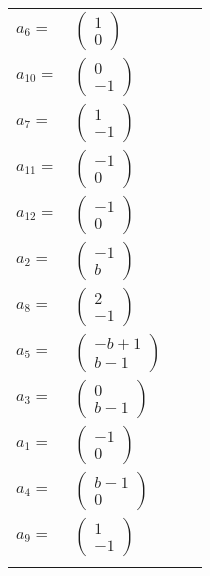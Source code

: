 \documentclass[1p]{elsarticle_modified}
\theoremstyle{definition}
\begin{document}
\begin{tabular}{m{7pt} m{180pt} m{7pt} m{180pt} }
\flushright $a_{6}=$&$\begin{pmatrix}1\\0\end{pmatrix}$ \\
\flushright $a_{10}=$&$\begin{pmatrix}0\\-1\end{pmatrix}$ \\
\flushright $a_{7}=$&$\begin{pmatrix}1\\-1\end{pmatrix}$ \\
\flushright $a_{11}=$&$\begin{pmatrix}-1\\0\end{pmatrix}$ \\
\flushright $a_{12}=$&$\begin{pmatrix}-1\\0\end{pmatrix}$ \\
\flushright $a_{2}=$&$\begin{pmatrix}-1\\b\end{pmatrix}$ \\
\flushright $a_{8}=$&$\begin{pmatrix}2\\-1\end{pmatrix}$ \\
\flushright $a_{5}=$&$\begin{pmatrix}- b+1\\b-1\end{pmatrix}$ \\
\flushright $a_{3}=$&$\begin{pmatrix}0\\b-1\end{pmatrix}$ \\
\flushright $a_{1}=$&$\begin{pmatrix}-1\\0\end{pmatrix}$ \\
\flushright $a_{4}=$&$\begin{pmatrix}b-1\\0\end{pmatrix}$ \\
\flushright $a_{9}=$&$\begin{pmatrix}1\\-1\end{pmatrix}$\\&\end{tabular}
\end{document}
